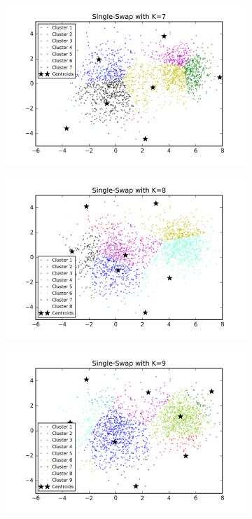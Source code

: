 \begin{description}
\begin{description}
\begin{figure}[!h]
\begin{subfigure}[b]{0.475\textwidth}
            \includegraphics[width=\textwidth]{./figures/clustering_singleSwap_7.png}
        \end{subfigure}
        \hfill
        \begin{subfigure}[b]{0.475\textwidth}  
            \centering 
            \includegraphics[width=\textwidth]{./figures/clustering_singleSwap_8.png}
        \end{subfigure}
        \begin{subfigure}[b]{0.475\textwidth}   
            \centering 
            \includegraphics[width=\textwidth]{./figures/clustering_singleSwap_9.png}

\end{subfigure}
\end{figure}
\end{description}
\end{description}
